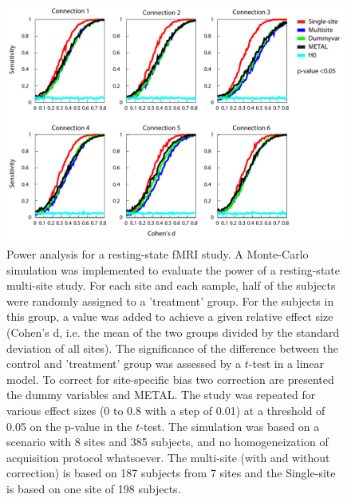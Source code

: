 \documentclass[authoryear]{elsarticle}
\begin{document}
\begin{figure}[H]
\begin{center}
\includegraphics[width=\linewidth]{../figures/multisite_simulation_50pct.pdf}
\end{center}
\caption[Detection power 2]{
Power analysis for a resting-state fMRI study. A Monte-Carlo simulation was implemented to evaluate the power of a resting-state multi-site study. For each site and each sample, half of the subjects were randomly assigned to a 'treatment' group. For the subjects in this group, a value was added to achieve a given relative effect size (Cohen's d, i.e. the mean of the two groups divided by the standard deviation of all sites). The significance of the difference between the control and 'treatment' group was assessed by a $t$-test in a linear model. To correct for site-specific bias two correction are presented the dummy variables and METAL. The study was repeated for various effect sizes (0 to 0.8 with a step of 0.01) at a threshold of 0.05 on the p-value in the $t$-test. The simulation was based on a scenario with 8 sites and 385 subjects, and no homogeneization of acquisition protocol whatsoever. The multi-site (with and without correction) is based on 187 subjects from 7 sites and the Single-site is based on 
one site of 198 subjects. 
}
\label{fig_simu_50pct}
\end{figure}
\end{document}
